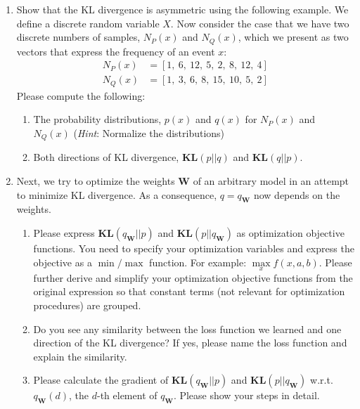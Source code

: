 \documentclass[a4paper]{article}
\begin{document}
\begin{enumerate}
\begin{enumerate}
	\item Show that the KL divergence is asymmetric using the following example. We define a discrete random variable $X$. Now consider the case that we have two discrete numbers of samples, $N_P(x)$ and $N_Q(x)$, which we present as two vectors that express the frequency of an event $x$:
	\begin{align*}
		N_P(x) & = [1,\ 6,\ 12,\ 5,\ 2,\ 8,\ 12,\ 4]\\
		N_Q(x) & = [1,\ 3,\ 6,\ 8,\ 15,\ 10,\ 5,\ 2]
	\end{align*}
	Please compute the following:
	\begin{enumerate}
		\item The probability distributions, $p(x)$ and $q(x)$ for $N_P(x)$ and $N_Q(x)$ (\textit{Hint}: Normalize the distributions)
		\item Both directions of KL divergence, \textbf{KL}$(p||q)$ and \textbf{KL}$(q||p)$. 
	\end{enumerate}
	
	\item Next, we try to optimize the weights $\bm{W}$ of an arbitrary model in an attempt to minimize KL divergence. As a consequence, $q=q_{\bm{W}}$ now depends on the weights.
	\begin{enumerate}
		\item Please express \textbf{KL}$(q_{\bm{W}}||p)$ and  \textbf{KL}$(p||q_{\bm{W}})$ as optimization objective functions. You need to specify your optimization variables and express the objective as a $\min/\max$ function. For example: $\max\limits_{x} f(x, a, b)$. Please further derive and simplify your optimization objective functions from the original expression so that constant terms (not relevant for optimization procedures) are grouped.
		\item Do you see any similarity between the loss function we learned and one direction of the KL divergence? If yes, please name the loss function and explain the similarity.
		\item Please calculate the gradient of \textbf{KL}$(q_{\bm{W}}||p)$ and  \textbf{KL}$(p||q_{\bm{W}})$ w.r.t. $q_{\bm{W}}(d)$, the $d$-th element of $q_{\bm{W}}$. Please show your steps in detail.
	\end{enumerate}
\end{enumerate}


\end{enumerate}
\end{document}

